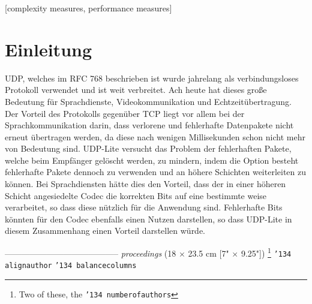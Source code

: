 \documentclass{template}
\begin{document}
\maketitle
\begin{abstract}
In diesem Dokument wird das Leightweight User Datagram Protokoll (UDP-Lite) beschrieben, welches ähnlich UDP ist. Der Focus dieses Dokuments liegt in der Beschreibung der Vorteile, die UDP-Lite gegenüber UDP aufweisen kann. Des Weiteren wird das Protokoll in das ISO OSI-Referenzmodell eingeordnet und die Auswirkungen auf andere Schichten in diesem beschrieben.

------------------------------
 \LaTeX\ {\em alternate} \textit{bla}
\end{abstract}

[complexity measures, performance measures]



\section{Einleitung}

UDP, welches im RFC 768 beschrieben ist wurde jahrelang als verbindungsloses Protokoll verwendet und ist weit verbreitet. Ach heute hat dieses große Bedeutung für Sprachdienste, Videokommunikation und Echtzeitübertragung. Der Vorteil des Protokolls gegenüber TCP liegt vor allem bei der Sprachkommunikation darin, dass verlorene und fehlerhafte Datenpakete nicht erneut übertragen werden, da diese nach wenigen Millisekunden schon nicht mehr von Bedeutung sind. UDP-Lite versucht das Problem der fehlerhaften Pakete, welche beim Empfänger gelöscht werden, zu mindern, indem die Option besteht fehlerhafte Pakete dennoch zu verwenden und an höhere Schichten weiterleiten zu können. Bei Sprachdiensten hätte dies den Vorteil, dass der in einer höheren Schicht angesiedelte Codec die korrekten Bits auf eine bestimmte weise verarbeitet, so dass diese nützlich für die Anwendung sind. Fehlerhafte Bits könnten für den Codec ebenfalls einen Nutzen darstellen, so dass UDP-Lite in diesem Zusammenhang einen Vorteil darstellen würde.



-----------------------------------------
\textit{proceedings}
(18 $\times$ 23.5 cm [7" $\times$ 9.25"])
\footnote{Two of these, the {\texttt{\char'134 numberofauthors}}}
{\texttt{\char'134 alignauthor}}
{\texttt{\char'134 balancecolumns}}
\end{document}
